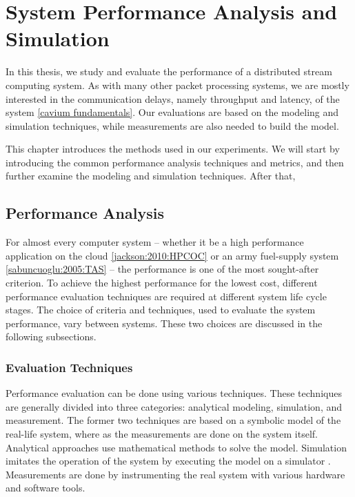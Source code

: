 \chapter{System Performance Analysis and Simulation}
\label{chapter:system-performance-analysis-and-simulation}
In this thesis, we study and evaluate the performance of a distributed stream computing system. As with many other packet processing systems, we are mostly interested in the communication delays, namely throughput and latency, of the system \ref{cavium fundamentals}. Our evaluations are based on the modeling and simulation techniques, while measurements are also needed to build the model.

This chapter introduces the methods used in our experiments. We will start by introducing the common performance analysis techniques and metrics, and then further examine the modeling and simulation techniques. After that, 

\section{Performance Analysis}
For almost every computer system -- whether it be a high performance application on the cloud \ref{jackson:2010:HPCOC} or an army fuel-supply system \ref{sabuncuoglu:2005:TAS} -- the performance is one of the most sought-after criterion. To achieve the highest performance for the lowest cost, different performance evaluation techniques are required at different system life cycle stages. The choice of criteria and techniques, used to evaluate the system performance, vary between systems. These two choices are discussed in the following subsections. \cite{jain:1991:AOCSPA}

\subsection{Evaluation Techniques}
Performance evaluation can be done using various techniques. These techniques are generally divided into three categories: analytical modeling, simulation, and measurement. The former two techniques are based on a symbolic model of the real-life system, where as the measurements are done on the system itself. Analytical approaches use mathematical methods to solve the model. Simulation imitates the operation of the system by executing the model on a simulator \cite{Banks:2010:DES}. Measurements are done by instrumenting the real system with various hardware and software tools. \cite{jain:1991:AOCSPA}

